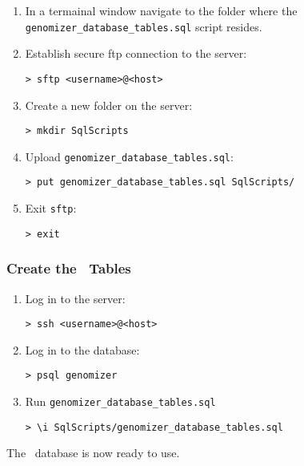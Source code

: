     \begin{enumerate}

      \item In a termainal window navigate to the folder where the \verb+genomizer_database_tables.sql+ script resides.

      \item Establish secure ftp connection to the server:
      \begin{verbatim}
> sftp <username>@<host>
      \end{verbatim}

      \item Create a new folder on the server:
      \begin{verbatim}
> mkdir SqlScripts
      \end{verbatim}

      \item Upload \verb+genomizer_database_tables.sql+:
      \begin{verbatim}
> put genomizer_database_tables.sql SqlScripts/
      \end{verbatim}

      \item Exit \texttt{sftp}:
      \begin{verbatim}
> exit
      \end{verbatim}

    \end{enumerate}

    \subsubsection{Create the \appName\ Tables}

    \begin{enumerate}

      \item Log in to the server:
      \begin{verbatim}
> ssh <username>@<host>
      \end{verbatim}

      \item Log in to the database:
      \begin{verbatim}
> psql genomizer
      \end{verbatim}

      \item Run \verb+genomizer_database_tables.sql+
      \begin{verbatim}
> \i SqlScripts/genomizer_database_tables.sql
      \end{verbatim}


    \end{enumerate}

The \appName\ database is now ready to use.